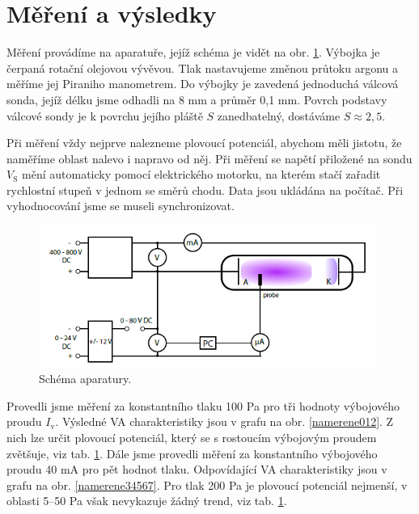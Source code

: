 \documentclass[a4paper,12pt]{article}
\begin{document}
\section{Měření a výsledky}
Měření provádíme na aparatuře, jejíž schéma je vidět na obr. \ref{schema}. Výbojka je čerpaná rotační olejovou vývěvou. Tlak nastavujeme změnou průtoku argonu a měříme jej Piraniho manometrem. Do výbojky je zavedená jednoduchá válcová sonda, jejíž délku jsme odhadli na 8 \si{\milli\meter} a průměr 0,1 \si{\milli\meter}. Povrch podstavy válcové sondy je k povrchu jejího pláště $S$ zanedbatelný, dostáváme $S \approx 2,5$. 

Při měření vždy nejprve nalezneme plovoucí potenciál, abychom měli jistotu, že naměříme oblast nalevo i napravo od něj. Při měření se napětí přiložené na sondu $V_\text{S}$ mění automaticky pomocí elektrického motorku, na kterém stačí zařadit rychlostní stupeň v jednom se směrů chodu. Data jsou ukládána na počítač. Při vyhodnocování jsme se museli synchronizovat.   

\begin{figure}[h]
	\centering
	\includegraphics[width=110mm]{schema.png}
	\caption{Schéma aparatury.}
	\label{schema}
\end{figure}

Provedli jsme měření za konstantního tlaku 100 \si{\pascal} pro tři hodnoty výbojového proudu $I_\text{v}$. Výsledné VA charakteristiky jsou v grafu na obr. \ref{namerene012}. Z nich lze určit plovoucí potenciál, který se s rostoucím výbojovým proudem zvětšuje, viz tab. \ref{}. Dále jsme provedli měření za konstantního výbojového proudu 40 \si{\milli\ampere} pro pět hodnot tlaku. Odpovídající VA charakteristiky jsou v grafu na obr. \ref{namerene34567}. Pro tlak 200 \si{\pascal} je plovoucí potenciál nejmenší, v oblasti 5--50 \si{\pascal} však nevykazuje žádný trend, viz tab. \ref{}.
\end{document}
